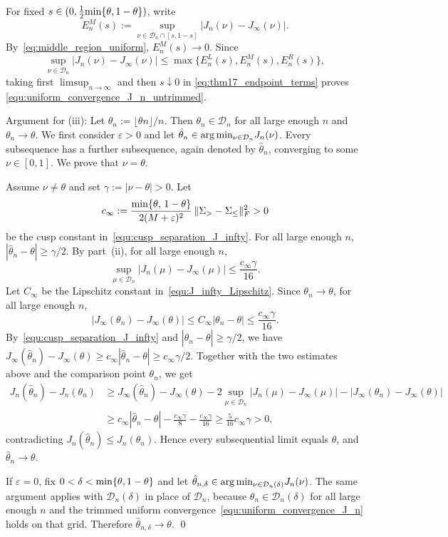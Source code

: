 \documentclass[10pt, letterpaper]{amsart}
\def\min{{\rm min}}
\begin{document}
For fixed $s\in(0,\frac12\min\{\theta,1-\theta\})$, write
\[
E_n^M(s):=
\sup_{\nu\in\mathcal D_n\cap[s,1-s]}
|J_n(\nu)-J_\infty(\nu)|.
\]
 By~\eqref{eq:middle_region_uniform}, $E_n^M(s)\to0$. Since
\[
\sup_{\nu\in\mathcal D_n}|J_n(\nu)-J_\infty(\nu)|
\leq\max\big\{E_n^L(s),E_n^M(s),E_n^R(s)\big\},
\]
taking first $\limsup_{n\to\infty}$ and then $s\downarrow0$ in
\eqref{eq:thm17_endpoint_terms} proves
\eqref{equ:uniform_convergence_J_n_untrimmed}.

\medskip
Argument for (iii): Let $\theta_n:=\lfloor \theta n\rfloor/n$. Then $\theta_n\in\mathcal D_n$ for all large enough $n$ and $\theta_n\to\theta$. We first consider $\varepsilon>0$ and let $\hat\theta_n\in\arg\min_{\nu\in\mathcal D_n}J_n(\nu)$. Every subsequence has a further subsequence, again denoted by $\hat\theta_n$, converging to some $\nu\in[0,1]$. We prove that $\nu=\theta$.

Assume $\nu\neq\theta$ and set $\gamma:=|\nu-\theta|>0$. Let
\[
c_\infty:=
\frac{\min\{\theta,\,1-\theta\}}{2(M+\varepsilon)^2}\,
\|\Sigma_{>}-\Sigma_{\leq}\|_F^2>0
\]
be the cusp constant in~\eqref{equ:cusp_separation_J_infty}. For all large enough $n$, $|\hat\theta_n-\theta|\geq\gamma/2$. By part~(ii), for all large enough $n$,
\[
\sup_{\mu\in\mathcal D_n}|J_n(\mu)-J_\infty(\mu)|
\leq \frac{c_\infty\gamma}{16}.
\]
Let $C_\infty$ be the Lipschitz constant in~\eqref{equ:J_infty_Lipschitz}. Since $\theta_n\to\theta$, for all large enough $n$,
\[
|J_\infty(\theta_n)-J_\infty(\theta)|
\leq C_\infty|\theta_n-\theta|
\leq \frac{c_\infty\gamma}{16}.
\]
 By~\eqref{equ:cusp_separation_J_infty} and $|\hat\theta_n-\theta|\geq\gamma/2$, we have $J_\infty(\hat\theta_n)-J_\infty(\theta)\geq c_\infty|\hat\theta_n-\theta|\geq c_\infty\gamma/2$. Together with the two estimates above and the comparison point $\theta_n$, we get
\begin{align*}
J_n(\hat\theta_n)-J_n(\theta_n)
&\geq
J_\infty(\hat\theta_n)-J_\infty(\theta)
-2\sup_{\mu\in\mathcal D_n}|J_n(\mu)-J_\infty(\mu)|
-|J_\infty(\theta_n)-J_\infty(\theta)|\\
&\geq
c_\infty|\hat\theta_n-\theta|
-\frac{c_\infty\gamma}{8}
-\frac{c_\infty\gamma}{16} \geq
\frac{5}{16}c_\infty\gamma>0,
\end{align*}
contradicting $J_n(\hat\theta_n)\leq J_n(\theta_n)$. Hence every subsequential limit equals $\theta$, and $\hat\theta_n\to\theta$.

If $\varepsilon=0$, fix $0<\delta<\min\{\theta,1-\theta\}$ and let $\hat\theta_{n,\delta}\in\arg\min_{\nu\in\mathcal D_n(\delta)}J_n(\nu)$. The same argument applies with $\mathcal D_n(\delta)$ in place of $\mathcal D_n$, because $\theta_n\in\mathcal D_n(\delta)$ for all large enough $n$ and the trimmed uniform convergence~\eqref{equ:uniform_convergence_J_n} holds on that grid. Therefore $\hat\theta_{n,\delta}\to\theta$. \qed
\end{document}
